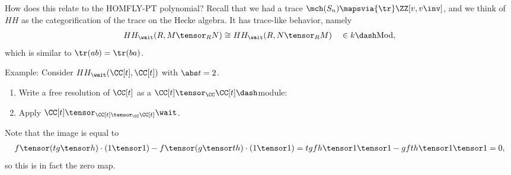 How does this relate to the HOMFLY-PT polynomial? Recall that we had a
trace \(\mch(S_n) \mapsvia{\tr} \ZZ[ v, v\inv]\), and we think of \(HH\)
as the categorification of the trace on the Hecke algebra. It has
trace-like behavior, namely \begin{align*}
HH_\wait(R, M\tensor_R N) \cong HH_\wait(R, N\tensor_R M) \quad \in k\dash\text{Mod}
,\end{align*} which is similar to \(\tr(ab) = \tr(ba)\).

Example: Consider \(HH_\wait(\CC[t], \CC[t])\) with \(\abs t = 2\).

\begin{enumerate}
\def\labelenumi{\arabic{enumi}.}
\tightlist
\item
  Write a free resolution of \(\CC[t]\) as a
  \(\CC[t] \tensor_\CC \CC[t]\dash\)module:

  \begin{center}
  \end{center}
\item
  Apply \(\CC[t] \tensor_{\CC[t] \tensor_\CC \CC[t]} \wait\).

  \begin{center}
  \end{center}
\end{enumerate}

Note that the image is equal to \begin{align*}
f \tensor (tg\tensor h) \cdot (1\tensor 1) - f\tensor (g\tensor th)\cdot (1\tensor 1) = 
tgfh \tensor 1\tensor 1 - gfth \tensor 1 \tensor 1 = 0
,\end{align*} so this is in fact the zero map.

